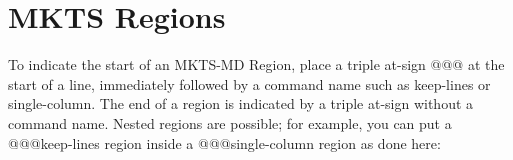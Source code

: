 
\begin{multicols}{2}\end{multicols}
\section{MKTS Regions 
}
\begin{multicols}{2}To indicate the start of an MKTS-MD Region, place a triple at-sign {\mktsStyleCode{}@@@}
at the start of a line, immediately followed by a command name such as
{\mktsStyleCode{}keep-lines} or {\mktsStyleCode{}single-column}. The end of a region is indicated by a
triple at-sign without a command name. Nested regions are possible; for example,
you can put a {\mktsStyleCode{}@@@keep-lines} region inside a {\mktsStyleCode{}@@@single-column} region as
done here:\mktsShowpar\par
\end{multicols}
